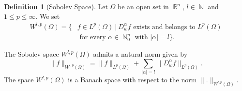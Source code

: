 \documentclass[12pt]{article}
\theoremstyle{definition}
\newtheorem{definition}{Definition}
\DeclareMathOperator\rr{\mathbb{R}}
\DeclareMathOperator\nn{\mathbb{N}}
\begin{document}
\begin{definition}[Sobolev Space]
Let $\Omega$ be an open set in $\rr^n$, $l \in \nn$ and $1\le p\le \infty$. We set
	\begin{align*} W^{l,p}(\Omega)=\{& f \in L^p(\Omega) \ | \ D^\alpha_w f \text{ exists and belongs to } L^p(\Omega)  \\
	 &\text{ for every } \alpha \in \nn^n_0 \text{ with } |\alpha|=l\}.
	\end{align*}
\end{definition}
The Sobolev space $W^{l,p}(\Omega)$ admits a natural norm given by
\[ \|f\|_{W^{l,p}(\Omega)}=\|f\|_{L^p(\Omega)}+\sum_{|\alpha|=l}\|D^\alpha_wf\|_{L^p(\Omega)}.\]
The space $W^{l,p}(\Omega)$ is a Banach space with respect to the norm $\| .\|_{W^{l,p}(\Omega)}$. \\\\
\end{document}

